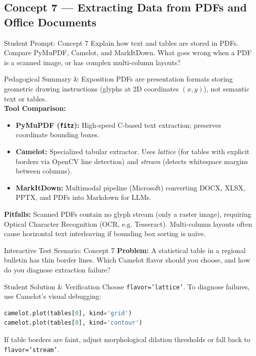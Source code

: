 \documentclass[11pt,a4paper]{article}
\begin{document}
\subsection{Concept 7 --- Extracting Data from PDFs and Office Documents}
\begin{promptbox}{Student Prompt: Concept 7}
Explain how text and tables are stored in PDFs. Compare PyMuPDF, Camelot, and MarkItDown. What goes wrong when a PDF is a scanned image, or has complex multi-column layouts?
\end{promptbox}

\begin{evalbox}{Pedagogical Summary \& Exposition}
PDFs are presentation formats storing geometric drawing instructions (glyphs at 2D coordinates $(x, y)$), not semantic text or tables.\\
\textbf{Tool Comparison:}
\begin{itemize}
    \item \textbf{PyMuPDF (\texttt{fitz}):} High-speed C-based text extraction; preserves coordinate bounding boxes.
    \item \textbf{Camelot:} Specialized tabular extractor. Uses \emph{lattice} (for tables with explicit borders via OpenCV line detection) and \emph{stream} (detects whitespace margins between columns).
    \item \textbf{MarkItDown:} Multimodal pipeline (Microsoft) converting DOCX, XLSX, PPTX, and PDFs into Markdown for LLMs.
\end{itemize}
\textbf{Pitfalls:} Scanned PDFs contain no glyph stream (only a raster image), requiring Optical Character Recognition (OCR, e.g. Tesseract). Multi-column layouts often cause horizontal text interleaving if bounding box sorting is naïve.
\end{evalbox}

\begin{testbox}{Interactive Test Scenario: Concept 7}
\textbf{Problem:} A statistical table in a regional bulletin has thin border lines. Which Camelot flavor should you choose, and how do you diagnose extraction failure?
\end{testbox}

\begin{evalbox}{Student Solution \& Verification}
Choose \texttt{flavor='lattice'}. To diagnose failures, use Camelot's visual debugging:
\begin{lstlisting}[language=Python]
camelot.plot(tables[0], kind='grid')
camelot.plot(tables[0], kind='contour')
\end{lstlisting}
If table borders are faint, adjust morphological dilation thresholds or fall back to \texttt{flavor='stream'}.
\end{evalbox}
\end{document}
